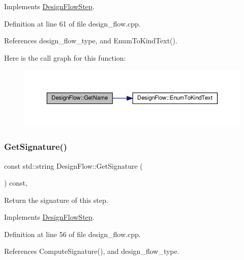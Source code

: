 Implements \hyperlink{classDesignFlowStep_a01e5ebfab88db3b3b7f832f80075fad8}{Design\+Flow\+Step}.



Definition at line 61 of file design\+\_\+flow.\+cpp.



References design\+\_\+flow\+\_\+type, and Enum\+To\+Kind\+Text().

Here is the call graph for this function\+:
\nopagebreak
\begin{figure}[H]
\begin{center}
\leavevmode
\includegraphics[width=350pt]{d2/d61/classDesignFlow_aa8b86491bfa371d09a22f863df1c5be8_cgraph}
\end{center}
\end{figure}
\mbox{\label{classDesignFlow_a0cfc751e3c286071ffb473e1165e1f46}} 
\subsubsection{\texorpdfstring{Get\+Signature()}{GetSignature()}}
{\footnotesize\ttfamily const std\+::string Design\+Flow\+::\+Get\+Signature (\begin{DoxyParamCaption}{ }\end{DoxyParamCaption}) const\hspace{0.3cm}{\ttfamily [override]}, {\ttfamily [virtual]}}



Return the signature of this step. 



Implements \hyperlink{classDesignFlowStep_ab111e3d4058615c2dedc0505978d4699}{Design\+Flow\+Step}.



Definition at line 56 of file design\+\_\+flow.\+cpp.



References Compute\+Signature(), and design\+\_\+flow\+\_\+type.

